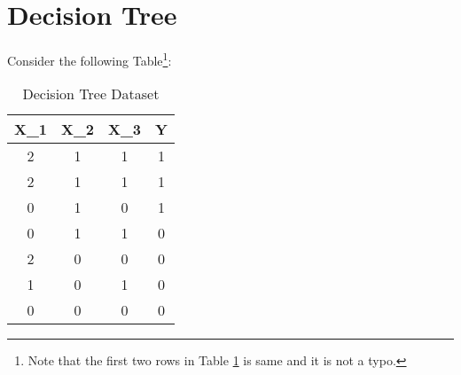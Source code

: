 \section{Decision Tree}

Consider the following Table\footnote{ Note that the first two rows in  Table \ref{tab:my_label} is same and it is not a typo.}:

\begin{table}[h]
    \centering
    \begin{tabular}{c|c|c|c}
       X_1 & X_2 & X_3 & Y \\
       \hline 
        2 & 1&1  &1 \\ 
        2 & 1&1  &1 \\
        0 & 1&0  &1 \\
        0 & 1&1  &0\\
        2 & 0&0  &0 \\
        1 & 0&1  &0 \\
        0 & 0&0  &0 \\
    \hline
    \end{tabular}
    \caption{Decision Tree Dataset}
    \label{tab:my_label}
\end{table}


